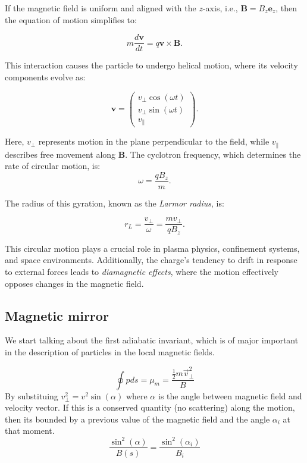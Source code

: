 \documentclass[smallextended]{svjour3}
\begin{document}
If the magnetic field is uniform and aligned with the \( z \)-axis, i.e., \( \mathbf{B} = B_z \mathbf{e}_z \), then the equation of motion simplifies to:

\begin{equation}
    m \frac{d\mathbf{v}}{dt} = q \mathbf{v} \times \mathbf{B}.
\end{equation}

This interaction causes the particle to undergo helical motion, where its velocity components evolve as:

\[
\mathbf{v} =
\begin{pmatrix}
v_{\perp} \cos(\omega t) \\
v_{\perp} \sin(\omega t) \\
v_{\parallel}
\end{pmatrix}.
\]

Here, \( v_{\perp} \) represents motion in the plane perpendicular to the field, while \( v_{\parallel} \) describes free movement along \( \mathbf{B} \). The cyclotron frequency, which determines the rate of circular motion, is:
\begin{equation}
    \omega = \frac{q B_z}{m}.
\end{equation}

The radius of this gyration, known as the \textit{Larmor radius}, is:

\begin{equation}
    r_L = \frac{v_\perp}{\omega} = \frac{m v_{\perp}}{q B_z}.
\end{equation}

This circular motion plays a crucial role in plasma physics, confinement systems, and space environments. Additionally, the charge’s tendency to drift in response to external forces leads to \textit{diamagnetic effects}, where the motion effectively opposes changes in the magnetic field. 

\subsection{Magnetic mirror}

We start talking about the first adiabatic invariant, which is of major important in the description of particles in the local magnetic fields.

\begin{equation}
    \oint p ds = \mu_m = \frac{\frac{1}{2}m\Vec{v}_\perp ^2}{B}
    \label{AdInvariant}
\end{equation}
By substituing $v_{\perp}^2 = v^2 \sin(\alpha)$ where $\alpha$ is the angle between magnetic field and velocity vector. If this is a conserved quantity (no scattering) along the motion, then its bounded by a previous value of the magnetic field and the angle $\alpha_i$ at that moment.
\begin{equation}
\frac{\sin^2(\alpha) }{B(s)}=\frac{\sin^2(\alpha_i) }{B_i} 
\end{equation}
\end{document}
